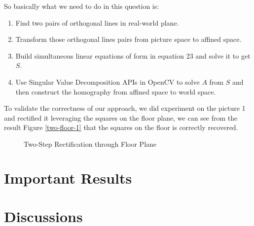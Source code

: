 \documentclass[conference]{IEEEtran}
\begin{document}
\noindent So basically what we need to do in this question is:
\begin{enumerate}
	\item Find two pairs of orthogonal lines in real-world plane.
	\item Transform those orthogonal lines pairs from picture space to affined space.
	\item Build simultaneous linear equations of form in equation 23 and solve it to get $S$.
	\item Use Singular Value Decomposition APIs in OpenCV to solve $A$ from $S$ and then construct the homography from affined space to world space.
\end{enumerate}

To validate the correctness of our approach, we did experiment on the picture 1 and rectified it leveraging the squares on the floor plane, we can see from the result Figure \ref{two-floor-1} that the squares on the floor is correctly recovered.

\begin{figure*}[!hpbt]
  \caption{Two-Step Rectification through Floor Plane}
  \label{two-step-rectify-floor} %
\end{figure*}

\section{Important Results}

\section{Discussions}







\end{document}
